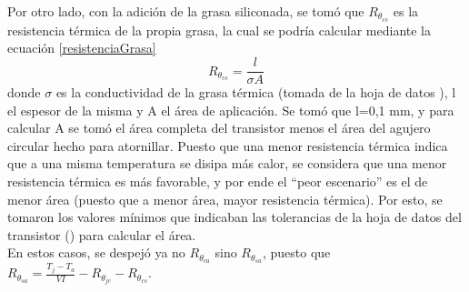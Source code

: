 \documentclass[
	a4paper, %
	10pt, %
	unnumberedsections, %
	twoside, %
]{LTJournalArticle}
\begin{document}
Por otro lado, con la adición de la grasa siliconada, se tomó que $ R_{\theta_{cs}} $ es la resistencia térmica de la propia grasa, la cual se podría calcular mediante la ecuación \ref{resistenciaGrasa}
\begin{equation*} \label{resistenciaGrasa}
    R_{\theta_{cs}} = \frac{l}{\sigma A}
\end{equation*}
donde $\sigma$ es la conductividad de la grasa térmica (tomada de la hoja de datos \cite{GrasaTermica}), l el espesor de la misma y A el área de aplicación. Se tomó que l=0,1 mm, y para calcular A se tomó el área completa del transistor menos el área del agujero circular hecho para atornillar. Puesto que una menor resistencia térmica indica que a una misma temperatura se disipa más calor, se considera que una menor resistencia térmica es más favorable, y por ende el ``peor escenario'' es el de menor área (puesto que a menor área, mayor resistencia térmica). Por esto, se tomaron los valores mínimos que indicaban las tolerancias de la hoja de datos del transistor (\cite{LM317}) para calcular el área.
\\ En estos casos, se despejó ya no $R_{\theta_{ca}}$ sino $R_{\theta_{sa}}$, puesto que $R_{\theta_{sa}} =\frac{T_j - T_a}{VI} - R_{\theta_{jc}} - R_{\theta_{cs}} $.

\printbibliography
\end{document}

